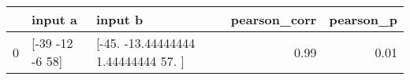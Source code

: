 \begin{tabular}{lllrr}
\toprule
 & input a & input b & pearson\_corr & pearson\_p \\
\midrule
0 & [-39 -12  -6  58] & [-45.         -13.44444444   1.44444444  57.        ] & 0.99 & 0.01 \\
\bottomrule
\end{tabular}
